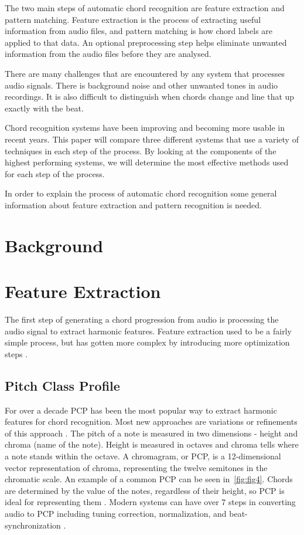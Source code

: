 \documentclass{sig-alternate}
\begin{document}
The two main steps of automatic chord recognition are feature extraction and pattern matching. Feature extraction is the process of extracting useful information from audio files, and pattern matching is how chord labels are applied to that data. An optional preprocessing step helps eliminate unwanted information from the audio files before they are analysed.

There are many challenges that are encountered by any system that processes audio signals. There is background noise and other unwanted tones in audio recordings. It is also difficult to distinguish when chords change and line that up exactly with the beat.  

Chord recognition systems have been improving and becoming more usable in recent years. This paper will compare three different systems that use a variety of techniques in each step of the process. By looking at the components of the highest performing systems, we will determine the most effective methods used for each step of the process. 

In order to explain the process of automatic chord recognition some general information about feature extraction and pattern recognition is needed.


\section{Background}

\section{Feature Extraction}

The first step of generating a chord progression from audio is processing the audio signal to extract harmonic features. Feature extraction used to be a fairly simple process, but has gotten more complex by introducing more optimization steps \cite{McVicar:2014}.

\subsection{Pitch Class Profile} 

For over a decade PCP has been the most popular way to extract harmonic features for chord recognition. Most new approaches are variations or refinements of this approach \cite{TaeMin:2014}. The pitch of a note is measured in two dimensions - height and chroma (name of the note). Height is measured in octaves and chroma tells where a note stands within the octave. A chromagram, or PCP, is a 12-dimensional vector representation of chroma, representing the twelve semitones in the chromatic scale. An example of a common PCP can be seen in~\ref{fig:fig4}. Chords are determined by the value of the notes, regardless of their height, so PCP is ideal for representing them \cite{Lee:2006}. Modern systems can have over 7 steps in converting audio to PCP including tuning correction, normalization, and beat-synchronization \cite{McVicar:2014}. 
\end{document}
